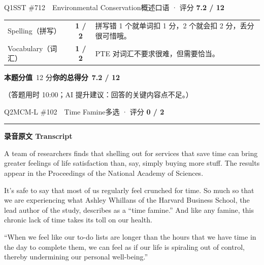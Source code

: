 \documentclass[11pt]{article}
\newcommand{\spart}[1]{\textcolor{cPartial}{\bfseries #1}} %
\newcommand{\ptesub}[1]{%
  \par\needspace{2\baselineskip}\smallskip
  {\color{cAccent}\rule[-0.2ex]{3pt}{1.05em}}\hspace{6pt}%
  {\bfseries\color{cHead}#1}\par\nopagebreak\smallskip}
\begin{document}
\begin{qblock}{Q1\quad SST \#712\ \ Environmental Conservation}{概述口语 · 评分 \textcolor{cAccent}{\bfseries 7.2 / 12}}
\begin{notebox}
{\begin{tabularx}{\linewidth}{@{}l c Z@{}}
Spelling（拼写）& \spart{1 / 2} & 拼写错 1 个就单词扣 1 分，2 个就会扣 2 分，丢分很可惜哦。\\
Vocabulary（词汇）& \spart{1 / 2} & PTE 对词汇不要求很难，但需要恰当。\\
\end{tabularx}}
\smallskip
\textbf{本题分值}\ 12 分\qquad\textbf{你的总得分}\ \textcolor{cAccent}{\bfseries 7.2 / 12}
\end{notebox}
\smallskip
{\footnotesize\color{gray}（答题用时 10:00；AI 提升建议：回答的关键内容点不足。）}
\end{qblock}

\begin{qblock}{Q2\quad MCM-L \#102\ \ Time Famine}{多选 · 评分 \textcolor{cAccent}{\bfseries 0 / 2}}
\ptesub{录音原文 Transcript}
\begin{promptbox}
A team of researchers finds that shelling out for services that save time can bring greater feelings of life satisfaction than, say, simply buying more stuff. The results appear in the Proceedings of the National Academy of Sciences.

It's safe to say that most of us regularly feel crunched for time. So much so that we are experiencing what Ashley Whillans of the Harvard Business School, the lead author of the study, describes as a ``time famine.'' And like any famine, this chronic lack of time takes its toll on our health.

``When we feel like our to-do lists are longer than the hours that we have time in the day to complete them, we can feel as if our life is spiraling out of control, thereby undermining our personal well-being.''


\end{promptbox}
\end{qblock}
\end{document}
